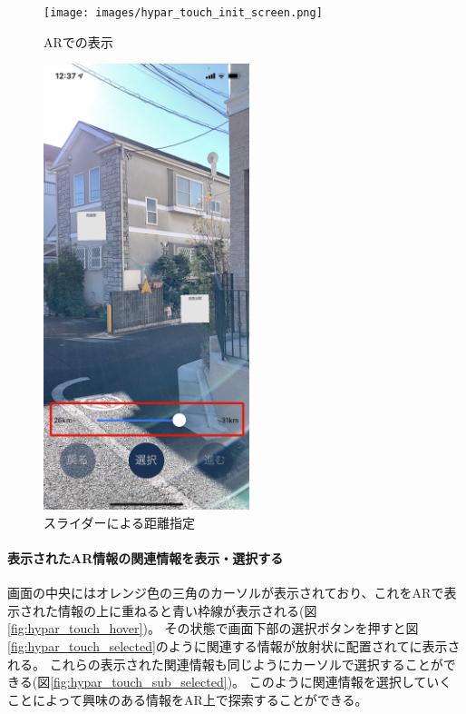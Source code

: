 \begin{figure}[h]
  \begin{minipage}{0.5\hsize}
    \centering
    \texttt{[image: images/hypar\_touch\_init\_screen.png]}
    \caption{ARでの表示} \label{fig:hypar_touch_init_screen}
  \end{minipage}
  \begin{minipage}{0.5\hsize}
    \centering
    \includegraphics[width=60mm]{images/hypar_touch_slider.png}
    \caption{スライダーによる距離指定} \label{fig:hypar_touch_slider}
  \end{minipage}
\end{figure}

\paragraph*{表示されたAR情報の関連情報を表示・選択する}
画面の中央にはオレンジ色の三角のカーソルが表示されており、これをARで表示された情報の上に重ねると青い枠線が表示される(図\ref{fig:hypar_touch_hover})。
その状態で画面下部の選択ボタンを押すと図\ref{fig:hypar_touch_selected}のように関連する情報が放射状に配置されてに表示される。
これらの表示された関連情報も同じようにカーソルで選択することができる(図\ref{fig:hypar_touch_sub_selected})。
このように関連情報を選択していくことによって興味のある情報をAR上で探索することができる。

